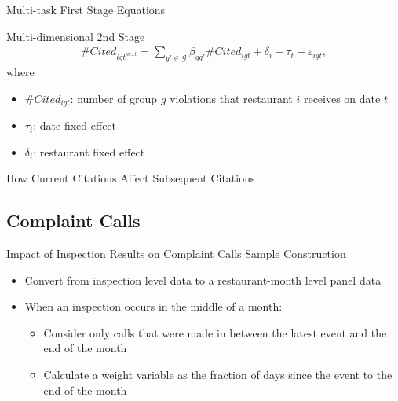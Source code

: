 \documentclass{beamer}
\begin{document}
\begin{frame}{Multi-task First Stage Equations}
\begin{table}[]
\scalebox{0.4}{
}
\end{table}
\end{frame}

\begin{frame}{Multi-dimensional 2nd Stage}
\begin{align*}
    \# Cited_{igt^{next}} = \sum_{g' \in \mathcal{G}} \beta_{gg'} \# Cited_{igt} + \delta_i + \tau_t + \varepsilon_{igt},
\end{align*}
where 
\begin{itemize}
\item $\# Cited_{igt}$: number of group $g$ violations that restaurant $i$ receives on date $t$
\item $\tau_t$: date fixed effect
\item $\delta_i$: restaurant fixed effect
\end{itemize}
\end{frame}
\begin{frame}{How Current Citations Affect Subsequent Citations}
\begin{table}[]
    \centering
    \scalebox{0.4}{
    }
\end{table}
\end{frame}

\subsection{Complaint Calls}

\begin{frame}{Impact of Inspection Results on Complaint Calls}
Sample Construction
\begin{itemize}
\item Convert from inspection level data to a restaurant-month level panel data
\item When an inspection occurs in the middle of a month: 
\begin{itemize}
\item Consider only calls that were made in between the latest event and the end of the month
\item Calculate a weight variable as the fraction of days since the event to the end of the month
\end{itemize}
\end{itemize}
\end{frame}
\end{document}

